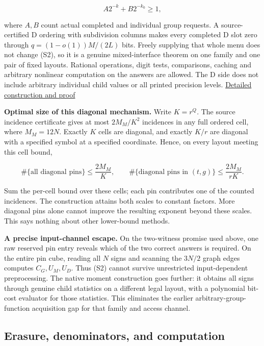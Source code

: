 \documentclass[
  11pt,
]{article}
\begin{document}
\[
                   A2^{-k}+B2^{-k_0}\ge1,                       \tag{S2}
\]

where \(A,B\) count actual completed and individual group requests. A
source-certified D ordering with subdivision columns makes every
completed D slot zero through \(q=(1-o(1))M/(2L)\) bits. Freely
supplying that whole menu does not change (S2), so it is a genuine
mixed-interface theorem on one family and one pair of fixed layouts.
Rational operations, digit tests, comparisons, caching and arbitrary
nonlinear computation on the answers are allowed. The D side does not
include arbitrary individual child values or all printed precision
levels. \hyperref[v9-section-joint-algorithms]{Detailed construction and
proof}

\textbf{Optimal size of this diagonal mechanism.} Write \(K=r^Q\). The
source incidence certificate gives at most \(2M_M/K^2\) incidences in
any full ordered cell, where \(M_M=12N\). Exactly \(K\) cells are
diagonal, and exactly \(K/r\) are diagonal with a specified symbol at a
specified coordinate. Hence, on every layout meeting this cell bound,

\[
 \#\{\text{all diagonal pins}\}\le\frac{2M_M}{K},\qquad
 \#\{\text{diagonal pins in }(t,g)\}\le\frac{2M_M}{rK}.          \tag{S3}
\]

Sum the per-cell bound over these cells; each pin contributes one of the
counted incidences. The construction attains both scales to constant
factors. More diagonal pins alone cannot improve the resulting exponent
beyond these scales. This says nothing about other lower-bound methods.

\textbf{A precise input-channel escape.} On the two-witness promise used
above, one raw reserved pin entry reveals which of the two correct
answers is required. On the entire pin cube, reading all \(N\) signs and
scanning the \(3N/2\) graph edges computes \(C_G,U_M,U_D\). Thus (S2)
cannot survive unrestricted input-dependent preprocessing. The native
moment construction goes further: it obtains all signs through genuine
child statistics on a different legal layout, with a polynomial bit-cost
evaluator for those statistics. This eliminates the earlier
arbitrary-group-function acquisition gap for that family and access
channel.

\subsection{Erasure, denominators, and
computation}\label{v9-erasure-denominators-and-computation}
\end{document}
